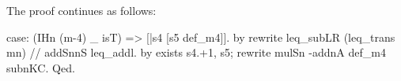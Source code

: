 % 

The proof continues as follows:

\lstset{firstnumber=10}
\begin{coq}{}{}
case: (IHn (m-4) _ isT) => [|s4 [s5 def_m4]].
  by rewrite leq_subLR (leq_trans mn) // addSnnS leq_addl.
by exists s4.+1, s5; rewrite mulSn -addnA def_m4 subnKC.
Qed.
\end{coq}
\lstset{firstnumber=1}

